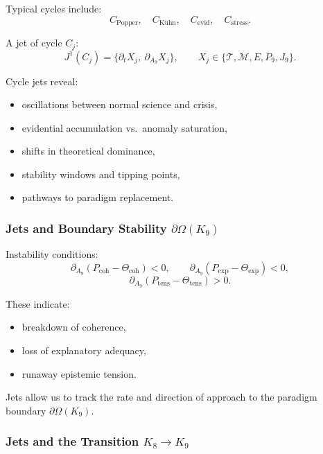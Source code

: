 Typical cycles include:
\[
C_{\mathrm{Popper}},\quad
C_{\mathrm{Kuhn}},\quad
C_{\mathrm{evid}},\quad
C_{\mathrm{stress}}.
\]

A jet of cycle $C_j$:
\[
J^1(C_j)
=
\{\partial_t X_j,\ \partial_{A_9}X_j\},
\qquad
X_j\in
\{\mathcal{T},\mathcal{M},E,P_9,J_9\}.
\]

Cycle jets reveal:
\begin{itemize}
    \item oscillations between normal science and crisis,
    \item evidential accumulation vs.\ anomaly saturation,
    \item shifts in theoretical dominance,
    \item stability windows and tipping points,
    \item pathways to paradigm replacement.
\end{itemize}


\subsubsection{Jets and Boundary Stability \texorpdfstring{$\partial\Omega(K_9)$}{\partial\Omega(K_9)}}

Instability conditions:
\[
\partial_{A_9}(P_{\mathrm{coh}}-\Theta_{\mathrm{coh}})<0,\qquad
\partial_{A_9}(P_{\mathrm{exp}}-\Theta_{\mathrm{exp}})<0,
\]
\[
\partial_{A_9}(P_{\mathrm{tens}}-\Theta_{\mathrm{tens}})>0.
\]

These indicate:
\begin{itemize}
    \item breakdown of coherence,
    \item loss of explanatory adequacy,
    \item runaway epistemic tension.
\end{itemize}

Jets allow us to track the rate and direction of approach to the
paradigm boundary $\partial\Omega(K_9)$.


\subsubsection{Jets and the Transition \texorpdfstring{$K_8 \to K_9$}{K_8 \to K_9}}

